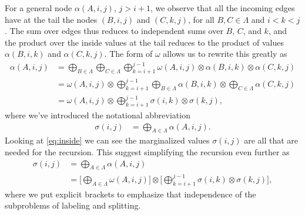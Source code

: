   For a general node $\alpha(A, i, j)$, $j > i + 1$, we observe that all the incoming edges have at the tail the nodes $(B, i, j)$ and $(C, k, j)$, for all $B, C \in \Lambda$ and $i < k < j$. The sum over edges thus reduces to independent sums over $B$, $C$, and $k$, and the product over the inside values at the tail reduces to the product of values $\alpha(B, i, k)$ and $\alpha(C, k, j)$. The form of $\omega$ allows us to rewrite this greatly as
  \begin{align}
    \label{eq:inside}
    \alpha(A, i, j)
      &= \bigoplus_{B \in \Lambda} \bigoplus_{C \in \Lambda} \bigoplus_{k=i+1}^{j-1} \omega(A, i, j) \otimes \alpha(B,i,k) \otimes \alpha(C,k,j) \nonumber \\
      &= \omega(A, i, j) \otimes \bigoplus_{k=i+1}^{j-1} \bigoplus_{B \in \Lambda} \alpha(B,i,k) \otimes \bigoplus_{C \in \Lambda} \alpha(C,k,j) \nonumber \\
      &= \omega(A, i, j) \otimes \bigoplus_{k=i+1}^{j-1} \sigma(i,k) \otimes \sigma(k,j),
  \end{align}
  where we've introduced the notational abbreviation
  \begin{align*}
      \sigma(i,j) &= \bigoplus_{A \in \Lambda} \alpha(A,i,j).
  \end{align*}
  Looking at \ref{eq:inside} we can see the marginalized values $\sigma(i, j)$ are all that are needed for the recursion. This suggest simplifying the recursion even further as
  \begin{align}
    \label{eq:inside-simplified}
    \sigma(i, j)
      &= \bigoplus_{A \in \Lambda} \alpha(A,i,j) \nonumber \\
      &= \Bigg[ \bigoplus_{A \in \Lambda} \omega(A, i, j) \Bigg] \otimes \Bigg[\bigoplus_{k=i+1}^{j-1} \sigma(i,k) \otimes  \sigma(k,j) \Bigg],
  \end{align}
  where we put explicit brackets to emphasize that independence of the subproblems of labeling and splitting.

